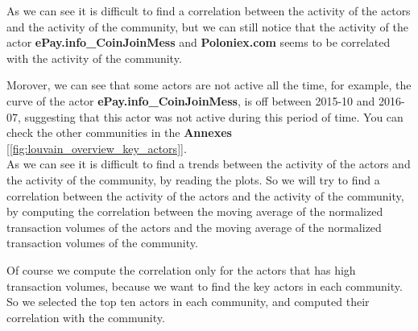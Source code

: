 \documentclass[a4paper, 12pt]{article}
\begin{document}
As we can see it is difficult to find a correlation between the activity of the actors and the activity of the community,
but we can still notice that the activity of the actor \textbf{ePay.info\_CoinJoinMess} and \textbf{Poloniex.com} 
seems to be correlated with the activity of the community.

Morover, we can see that some actors are not active all the time, for example, the curve of the actor \textbf{ePay.info\_CoinJoinMess},
is off between 2015-10 and 2016-07, suggesting that this actor was not active during this period of time. 
You can check the other communities in the \textbf{Annexes} [\ref{fig:louvain_overview_key_actors}]. \\ 

As we can see it is difficult to find a trends between the activity of the actors and the activity of the community, by reading the plots.
So we will try to find a correlation between the activity of the actors and the activity of the community,
by computing the correlation between the moving average of the normalized transaction volumes of the actors
and the moving average of the normalized transaction volumes of the community.

Of course we compute the correlation only for the actors that has high transaction volumes, because we want to find the key actors in each community.
So we selected the top ten actors in each community, and computed their correlation with the community.
\end{document}

